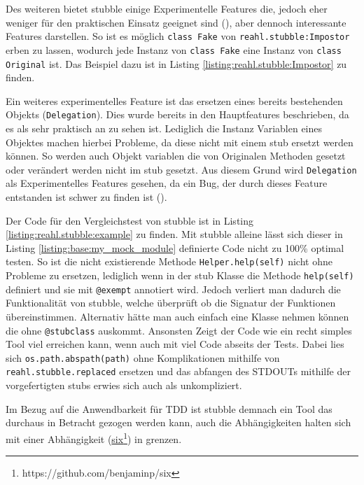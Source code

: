 Des weiteren bietet stubble einige Experimentelle Features die, jedoch eher
weniger für den praktischen Einsatz geeignet sind (\cite{reahl.stubble:4.0}),
aber dennoch interessante Features darstellen. So ist es möglich
\lstinline{class Fake} von \lstinline{reahl.stubble:Impostor} erben zu lassen,
wodurch jede Instanz von \lstinline{class Fake} eine Instanz von
\lstinline{class Original} ist. Das Beispiel dazu ist in Listing
\ref{listing:reahl.stubble:Impostor} zu finden.

Ein weiteres experimentelles Feature ist das ersetzen eines bereits bestehenden
Objekts (\lstinline{Delegation}). Dies wurde bereits in den Hauptfeatures
beschrieben, da es als sehr praktisch an zu sehen ist. Lediglich die Instanz
Variablen eines Objektes machen hierbei Probleme, da diese nicht mit einem
\Gls{stub} ersetzt werden können. So werden auch Objekt variablen die von
Originalen Methoden gesetzt oder verändert werden nicht im \Gls{stub} gesetzt.
Aus diesem Grund wird \lstinline{Delegation} als Experimentelles Features
gesehen, da ein Bug, der durch dieses Feature entstanden ist schwer zu finden
ist (\cite{reahl.stubble:4.0}).
\newline

Der Code für den Vergleichstest von stubble ist in Listing
\ref{listing:reahl.stubble:example} zu finden. Mit stubble alleine lässt sich
dieser in Listing \ref{listing:base:my_mock_module} definierte Code nicht zu 100\%
optimal testen.
So ist die nicht existierende Methode \lstinline{Helper.help(self)} nicht
ohne Probleme zu ersetzen, lediglich wenn in der \Gls{stub} Klasse die Methode
\lstinline{help(self)} definiert und sie mit \lstinline{@exempt} annotiert wird.
Jedoch verliert man dadurch die Funktionalität von stubble, welche überprüft ob
die Signatur der Funktionen übereinstimmen. Alternativ hätte man auch einfach
eine Klasse nehmen können die ohne \lstinline{@stubclass} auskommt. Ansonsten
Zeigt der Code wie ein recht simples Tool viel erreichen kann, wenn auch mit
viel Code abseits der Tests. Dabei lies sich \lstinline{os.path.abspath(path)}
ohne Komplikationen mithilfe von \lstinline{reahl.stubble.replaced} ersetzen und
das abfangen des STDOUTs mithilfe der vorgefertigten \Glspl{stub} erwies sich
auch als unkompliziert.
\newline

Im Bezug auf die Anwendbarkeit für TDD ist stubble demnach ein Tool das durchaus
in Betracht gezogen werden kann, auch die Abhängigkeiten halten sich mit einer
Abhängigkeit
(\href{https://github.com/benjaminp/six}{six}\footnote{https://github.com/benjaminp/six})
in grenzen.

